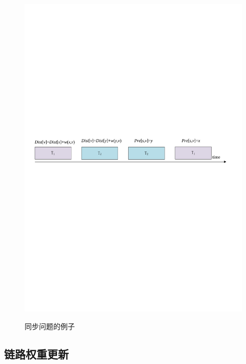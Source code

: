 \begin{figure}
\setlength{\belowcaptionskip}{-0.1cm}
  \begin{center}
    {\includegraphics[width=0.8 \textwidth]{figures/SynPro.pdf}}
    \end{center}
  \caption{{\footnotesize{同步问题的例子}}}
  \label{SynPro}
\end{figure}
\subsection{链路权重更新}
